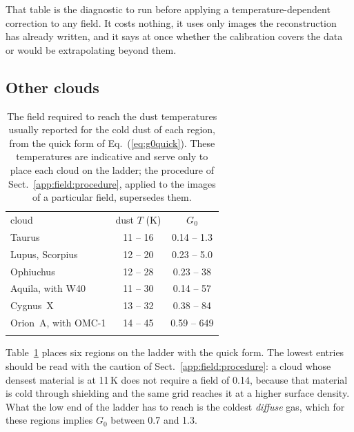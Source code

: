 That table is the diagnostic to run before applying a temperature-dependent correction to any field.  It costs nothing, it uses
only images the reconstruction has already written, and it says at once whether the calibration covers the data or would be
extrapolating beyond them.

\subsection{Other clouds}
\label{app:field:others}

\begin{table}
\caption{The field required to reach the dust temperatures usually reported for the cold dust of each region, from the quick form
of Eq.~(\ref{eq:g0quick}).  These temperatures are indicative and serve only to place each cloud on the ladder; the procedure of
Sect.~\ref{app:field:procedure}, applied to the images of a particular field, supersedes them.}
\label{tab:g0}
\centering
\begin{tabular}{lcc}
\hline\hline
\noalign{\smallskip}
cloud & dust $T$ (K) & $G_0$ \\
\noalign{\smallskip}
\hline
\noalign{\smallskip}
Taurus              & 11 -- 16 & 0.14 -- 1.3 \\
Lupus, Scorpius     & 12 -- 20 & 0.23 -- 5.0 \\
Ophiuchus           & 12 -- 28 & 0.23 -- 38 \\
Aquila, with W40    & 11 -- 30 & 0.14 -- 57 \\
Cygnus~X            & 13 -- 32 & 0.38 -- 84 \\
Orion~A, with OMC-1 & 14 -- 45 & 0.59 -- 649 \\
\noalign{\smallskip}
\hline
\end{tabular}
\end{table}

Table~\ref{tab:g0} places six regions on the ladder with the quick form.    The lowest entries should
be read with the caution of Sect.~\ref{app:field:procedure}: a cloud whose densest material is at 11\,K does not require a field
of 0.14, because that material is cold through shielding and the same grid reaches it at a higher surface density.  What the low
end of the ladder has to reach is the coldest \emph{diffuse} gas, which for these regions implies $G_0$ between 0.7 and 1.3.

